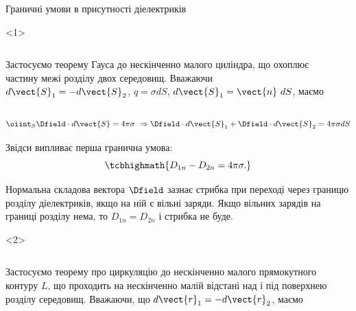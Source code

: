 \documentclass[]{beamer}
\begin{document}
\begin{frame}{Граничні умови в присутності діелектриків}{}
	\begin{onlyenv}
		\begin{columns}
			\begin{column}{0.6\linewidth}
				\begin{block}{}\scriptsize\justifying
					Застосуємо теорему Гауса до нескінченно малого циліндра, що охоплює частину межі
					розділу двох
					середовищ. Вважаючи $d\vect{S}_1 = - d\vect{S}_2$, $q = \sigma dS$,
					$d\vect{S}_1 =
						\vect{n}\ dS$,
					маємо
				\end{block}
			\end{column}
			\begin{column}{0.4\linewidth}\centering
				
			\end{column}
		\end{columns}
		\begin{block}{}\scriptsize
			\begin{equation*}
				\oiint_S \Dfield\cdot d\vect{S} = 4\pi\sigma\ \Rightarrow  \Dfield\cdot
				d\vect{S}_1 +
				\Dfield\cdot d\vect{S}_2 = 4\pi\sigma dS
			\end{equation*}
		\end{block}
		\begin{block}{}
			Звідси випливає перша гранична умова:
			\begin{equation*}
				\tcbhighmath{
					D_{1n} - D_{2n} = 4\pi\sigma.
				}
			\end{equation*}
		\end{block}
		\begin{alertblock}{}\justifying\scriptsize
			Нормальна складова вектора $\Dfield$ зазнає стрибка при
			переході через границю розділу діелектриків, якщо на ній є вільні заряди. Якщо вільних
			зарядів на границі розділу нема, то $D_{1n} = D_{2n}$ і стрибка не буде.
		\end{alertblock}
	\end{onlyenv}
	\begin{onlyenv}
		\begin{columns}
			\begin{column}{0.6\linewidth}
				\begin{block}{}\scriptsize\justifying
					Застосуємо теорему про циркуляцію до нескінченно малого прямокутного
					контуру $L$, що проходить на нескінченно малій відстані над і під поверхнею
					розділу середовищ. Вважаючи, що $d\vect{r}_1 = -d\vect{r}_2$, маємо

\end{block}
\end{column}
\end{columns}
\end{onlyenv}
\end{frame}
\end{document}
